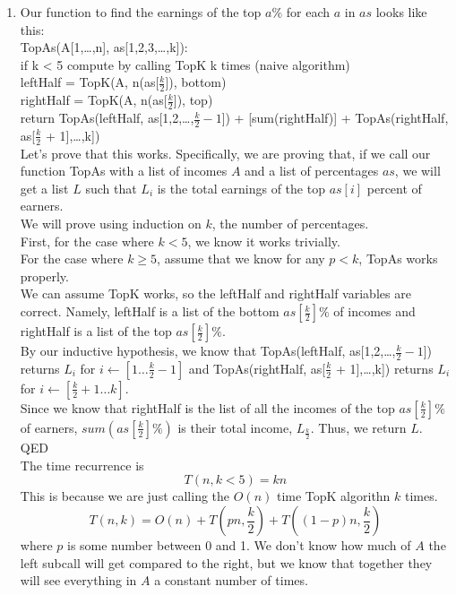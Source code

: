 \documentclass[11pt]{article}
\begin{document}
\begin{solution}
\begin{enumerate}
        \item Our function to find the earnings of the top $a\%$ for each $a$ in $as$ looks like this: \\
            TopAs(A[1,\ldots,n], as[1,2,3,\ldots,k]): \\
            if k < 5 compute by calling TopK k times (naive algorithm) \\
            leftHalf = TopK(A, n(as[$\frac{k}{2}$]), bottom) \\
            rightHalf = TopK(A, n(as[$\frac{k}{2}$]), top) \\
            return TopAs(leftHalf, as[1,2,\ldots,$\frac{k}{2} - 1$]) + [sum(rightHalf)] + TopAs(rightHalf, as[$\frac{k}{2}$ + 1],\ldots,k]) \\

            Let's prove that this works. Specifically, we are proving that, if we call our function TopAs with a list of incomes $A$ and a list of percentages $as$, we will get a list $L$ such that $L_i$ is the total earnings of the top $as[i]$ percent of earners. \\
            We will prove using induction on $k$, the number of percentages. \\
            First, for the case where $k < 5$, we know it works trivially. \\
            For the case where $k \geq 5$, assume that we know for any $p < k$, TopAs works properly. \\
            We can assume TopK works, so the leftHalf and rightHalf variables are correct. Namely, leftHalf is a list of the bottom $as[\frac{k}{2}]\%$ of incomes and rightHalf is a list of the top $as[\frac{k}{2}]\%$. \\
            By our inductive hypothesis, we know that TopAs(leftHalf, as[1,2,\ldots,$\frac{k}{2} - 1$]) returns $L_i$ for $i \leftarrow [1\ldots \frac{k}{2} - 1]$ and TopAs(rightHalf, as[$\frac{k}{2}$ + 1],\ldots,k]) returns $L_i$ for $i \leftarrow [\frac{k}{2} + 1\ldots k]$. \\
            Since we know that rightHalf is the list of all the incomes of the top $as[\frac{k}{2}]\%$ of earners, $sum(as[\frac{k}{2}]\%)$ is their total income, $L_\frac{k}{2}$. Thus, we return $L$. \\
            QED \\

            The time recurrence is 
            \[
                T(n, k < 5) = kn
            \]
            This is because we are just calling the $O(n)$ time TopK algorithn $k$ times.
            \[
                T(n, k) = O(n) + T\left(pn, \frac{k}{2}\right) + T\left((1 - p)n, \frac{k}{2}\right)
            \]
            where $p$ is some number between 0 and 1. We don't know how much of $A$ the left subcall will get compared to the right, but we know that together they will see everything in $A$ a constant number of times. \\


\end{enumerate}
\end{solution}
\end{document}
